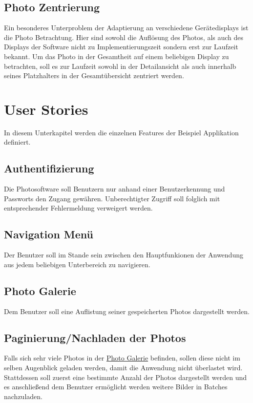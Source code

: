 \subsection{Photo Zentrierung}

Ein besonderes Unterproblem der Adaptierung an verschiedene Gerätedisplays ist die Photo Betrachtung. Hier sind sowohl die Auflösung des Photos, als auch des Displays der Software nicht zu Implementierungszeit sondern erst zur Laufzeit bekannt. Um das Photo in der Gesamtheit auf einem beliebigen Display zu betrachten, soll es zur Laufzeit sowohl in der Detailansicht als auch innerhalb seines Platzhalters in der Gesamtübersicht zentriert werden. 

\section{User Stories}

In diesem Unterkapitel werden die einzelnen Features der Beispiel Applikation definiert.

\subsection{Authentifizierung}

Die Photosoftware soll Benutzern nur anhand einer Benutzerkennung und Passworts 
den Zugang gewähren. Unberechtigter Zugriff soll folglich mit entsprechender Fehlermeldung verweigert werden.

\subsection{Navigation Menü}

Der Benutzer soll im Stande sein zwischen den Hauptfunkionen der Anwendung aus jedem beliebigen Unterbereich zu navigieren.

\subsection{Photo Galerie}
\label{ssec:photo_galerie}

Dem Benutzer soll eine Auflistung seiner gespeicherten Photos dargestellt werden.

\subsection{Paginierung/Nachladen der Photos}

Falls sich sehr viele Photos in der \hyperref[ssec:photo_galerie]{Photo Galerie} befinden, sollen diese nicht im selben Augenblick geladen werden, damit die Anwendung nicht überlastet wird. Stattdessen soll zuerst eine bestimmte Anzahl der Photos dargestellt werden und es anschließend dem Benutzer ermöglicht werden weitere Bilder in Batches nachzuladen.

